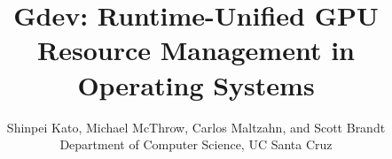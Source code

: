 \documentclass[letterpaper,twocolumn,10pt]{article}
\begin{document}
\date{}

\title{\Large \bf
Gdev: Runtime-Unified GPU Resource Management in Operating Systems
}

\author{
{\rm Shinpei Kato,
Michael McThrow,
Carlos Maltzahn,
and Scott Brandt
}\\
Department of Computer Science, UC Santa Cruz
} %

\maketitle

\thispagestyle{empty}
\pagestyle{empty}




%
%
%
%
%
%


\end{document}
